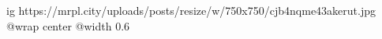  
 
 
 
 

\ifcmt
  ig https://mrpl.city/uploads/posts/resize/w/750x750/cjb4nqme43akerut.jpg
  @wrap center
  @width 0.6
\fi
